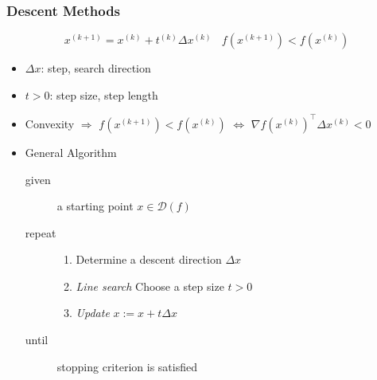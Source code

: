 \subsubsection*{Descent Methods}
\begin{equation}
    x^{(k+1)}=x^{(k)}+t^{(k)}\Delta x^{(k)}~~~~f(x^{(k+1)})<f(x^{(k)})
\end{equation}
\begin{itemize}
    \item $\Delta x$: step, search direction
    \item $t>0$: step size, step length
    \item Convexity $\Rightarrow$ $f(x^{(k+1)})<f(x^{(k)})$ $\Leftrightarrow$ $\nabla f(x^{(k)})^{\top}\Delta x^{(k)}<0$
    \item General Algorithm
    \begin{description}
        \item[given] a starting point $x\in\mathcal{D}(f)$
        \item[repeat] \phantom{}
        \begin{enumerate}
            \item Determine a descent direction $\Delta x$
            \item \textit{Line search} Choose a step size $t>0$
            \item \textit{Update} $x:=x+t\Delta x$
        \end{enumerate}
        \item[until] stopping criterion is satisfied
    \end{description}
\end{itemize}

